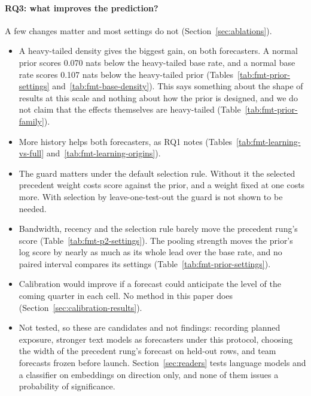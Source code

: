 \paragraph{RQ3: what improves the prediction?} A few changes matter and most settings do not (Section~\ref{sec:ablations}).
\begin{itemize}
\item A heavy-tailed density gives the biggest gain, on both forecasters. A normal prior scores 0.070 nats below the heavy-tailed base rate, and a normal base rate scores 0.107 nats below the heavy-tailed prior (Tables~\ref{tab:fmt-prior-settings} and~\ref{tab:fmt-base-density}). This says something about the shape of results at this scale and nothing about how the prior is designed, and we do not claim that the effects themselves are heavy-tailed (Table~\ref{tab:fmt-prior-family}).
\item More history helps both forecasters, as RQ1 notes (Tables~\ref{tab:fmt-learning-vs-full} and~\ref{tab:fmt-learning-origins}).
\item The guard matters under the default selection rule. Without it the selected precedent weight costs score against the prior, and a weight fixed at one costs more. With selection by leave-one-test-out the guard is not shown to be needed.
\item Bandwidth, recency and the selection rule barely move the precedent rung's score (Table~\ref{tab:fmt-p2-settings}). The pooling strength moves the prior's log score by nearly as much as its whole lead over the base rate, and no paired interval compares its settings (Table~\ref{tab:fmt-prior-settings}).
\item Calibration would improve if a forecast could anticipate the level of the coming quarter in each cell. No method in this paper does (Section~\ref{sec:calibration-results}).
\item Not tested, so these are candidates and not findings: recording planned exposure, stronger text models as forecasters under this protocol, choosing the width of the precedent rung's forecast on held-out rows, and team forecasts frozen before launch. Section~\ref{sec:readers} tests language models and a classifier on embeddings on direction only, and none of them issues a probability of significance.
\end{itemize}

